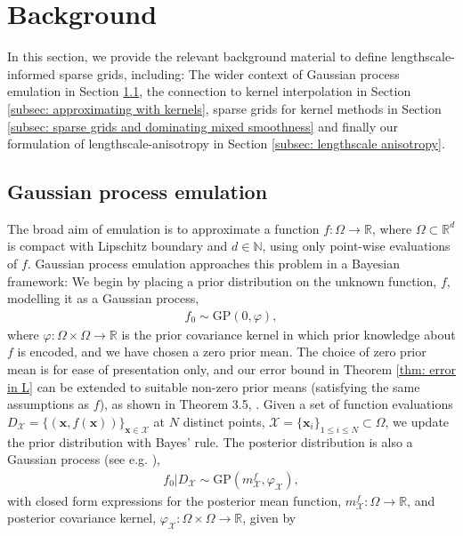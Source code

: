 \documentclass[pdflatex,sn-mathphys-num]{sn-jnl}%
\theoremstyle{thmstyleone}%
\theoremstyle{thmstyletwo}%
\theoremstyle{thmstylethree}%
\begin{document}
\section{Background}\label{sec: background}
In this section, we provide the relevant background material to define lengthscale-informed sparse grids, including: The wider context of Gaussian process emulation in Section \ref{subsec: gaussian process emulation}, the connection to kernel interpolation in Section \ref{subsec: approximating with kernels}, sparse grids for kernel methods in Section \ref{subsec: sparse grids and dominating mixed smoothness} and finally our formulation of lengthscale-anisotropy in Section \ref{subsec: lengthscale anisotropy}. 

\subsection{Gaussian process emulation}\label{subsec: gaussian process emulation}
The broad aim of emulation is to approximate a function \(f:\Omega\rightarrow \mathbb{R}\), where \(\Omega\subset\mathbb{R}^d\) is compact with Lipschitz boundary and \(d\in\mathbb{N}\), using only point-wise evaluations of \(f\). Gaussian process emulation approaches this problem in a Bayesian framework: We begin by placing a prior distribution on the unknown function, \(f\), modelling it as a Gaussian process,
\begin{align}
    f_0\sim\textrm{GP}(0,\varphi),\nonumber
\end{align}
where \(\varphi:\Omega\times\Omega\rightarrow\mathbb{R}\) is the prior covariance kernel in which prior knowledge about \(f\) is encoded, and we have chosen a zero prior mean. The choice of zero prior mean is for ease of presentation only, and our error bound in Theorem \ref{thm: error in L} can be extended to suitable non-zero prior means (satisfying the same assumptions as $f$), as shown in Theorem 3.5, \cite{Teckentrup2020}. Given a set of function evaluations \(D_{\mathcal{X}}=\{(\mathbf{x},f(\mathbf{x}))\}_{\mathbf{x}\in\mathcal{X}}\)  at \(N\) distinct points, \(\mathcal{X}=\{\mathbf{x}_i\}_{1\leq i\leq N}\subset\Omega\), we update the prior distribution with Bayes' rule. 
The posterior distribution is also a Gaussian process (see e.g. \cite{Rasmussen2005}),
\begin{align}
    f_0|D_{\mathcal{X}}\sim\textrm{GP}(m^f_{\mathcal{X}},\varphi_{\mathcal{X}}),\nonumber
\end{align}
with closed form expressions for the posterior mean function, \(m^f_{\mathcal{X}}:\Omega\rightarrow\mathbb{R}\), and posterior covariance kernel, \(\varphi_{\mathcal{X}}:\Omega \times \Omega \rightarrow\mathbb{R}\), given by
\end{document}
